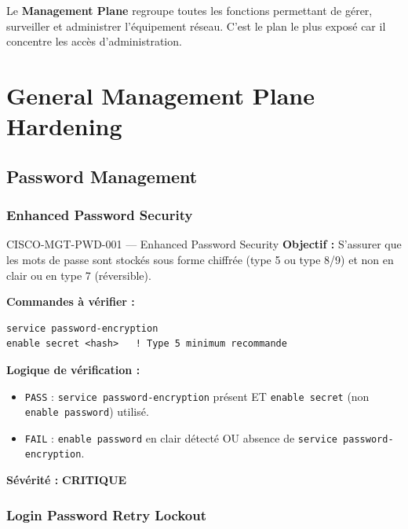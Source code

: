 \documentclass[12pt, a4paper]{report}
\begin{document}
Le \textbf{Management Plane} regroupe toutes les fonctions permettant de gérer, surveiller et administrer l'équipement réseau. C'est le plan le plus exposé car il concentre les accès d'administration.

\section{General Management Plane Hardening}

\subsection{Password Management}

\subsubsection{Enhanced Password Security}

\begin{rulebox}{CISCO-MGT-PWD-001 — Enhanced Password Security}
  \textbf{Objectif :} S'assurer que les mots de passe sont stockés sous forme chiffrée (type 5 ou type 8/9) et non en clair ou en type 7 (réversible).

  \textbf{Commandes à vérifier :}
  \begin{lstlisting}
service password-encryption
enable secret <hash>   ! Type 5 minimum recommande
  \end{lstlisting}

  \textbf{Logique de vérification :}
  \begin{itemize}
    \item \texttt{PASS} : \texttt{service password-encryption} présent ET \texttt{enable secret} (non \texttt{enable password}) utilisé.
    \item \texttt{FAIL} : \texttt{enable password} en clair détecté OU absence de \texttt{service password-encryption}.
  \end{itemize}

  \textbf{Sévérité :} \textcolor{accentRed}{\textbf{CRITIQUE}}
\end{rulebox}

\subsubsection{Login Password Retry Lockout}
\end{document}
